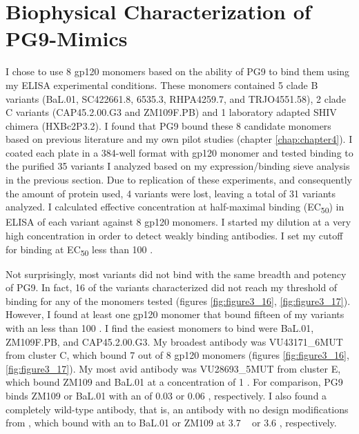 \section{Biophysical Characterization of PG9-Mimics}
I chose to use 8 gp120 monomers based on the ability of PG9 to bind them using my ELISA experimental conditions. These monomers contained 5 clade B variants (BaL.01, SC422661.8, 6535.3, RHPA4259.7, and TRJO4551.58), 2 clade C variants (CAP45.2.00.G3 and ZM109F.PB) and 1 laboratory adapted SHIV chimera (HXBc2P3.2). I found that PG9 bound these 8 candidate monomers based on previous literature \citep{McLellan:2011dg} and my own pilot studies (chapter \ref{chap:chapter4}). I coated each plate in a 384-well format with gp120 monomer and tested binding to the purified 35 variants I analyzed based on my expression/binding sieve analysis in the previous section. Due to replication of these experiments, and consequently the amount of protein used, 4 variants were lost, leaving a total of 31 variants analyzed. I calculated effective concentration at half-maximal binding (EC\textsubscript{50}) in ELISA of each variant against 8 gp120 monomers. I started my dilution at a very high concentration in order to detect weakly binding antibodies. I set my cutoff for binding at EC\textsubscript{50} less than 100 \mcml.

Not surprisingly, most variants did not bind with the same breadth and potency of PG9. In fact, 16 of the variants characterized did not reach my threshold of binding for any of the monomers tested (figures \ref{fig:figure3_16}, \ref{fig:figure3_17}). However, I found at least one gp120 monomer that bound fifteen of my variants with an \ec less than 100 \mcml. I find the easiest monomers to bind were BaL.01, ZM109F.PB, and CAP45.2.00.G3. My broadest antibody was VU43171\_6MUT from cluster C, which bound 7 out of 8 gp120   monomers (figures \ref{fig:figure3_16}, \ref{fig:figure3_17}). My most avid antibody was VU28693\_5MUT from cluster E, which bound ZM109 and BaL.01 at a concentration of 1 \mcml. For comparison, PG9 binds ZM109 or BaL.01 with an \ec of 0.03 \mcml or 0.06 \mcml, respectively. I also found a completely wild-type antibody, that is, an antibody with no design modifications from \rosetta, which bound with an \ec to BaL.01 or ZM109 at 3.7 \mcml~
or 3.6 \mcml, respectively.

